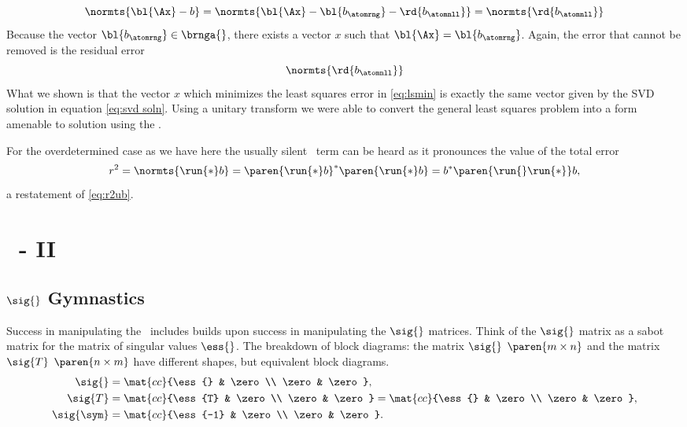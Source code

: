   \begin{equation*}   %
    \normts{ \bl{\Ax} - b } = \normts{ \bl{\Ax} - \bl{b_{\atomrng}} - \rd{b_{\atomnll}} } = \normts{ \rd{b_{\atomnll}} }
  \end{equation*}
Because the vector $\bl{b_{\atomrng}} \in \brnga{}$, there exists a vector $x$ such that $\bl{\Ax} = \bl{b_{\atomrng}}$. Again, the error that cannot be removed is the residual error
  \begin{equation*}   %
    \normts{ \rd{b_{\atomnll}} }
  \end{equation*}
What we shown is that the vector $x$ which minimizes the least squares error in \eqref{eq:lsmin} is exactly the same vector given by the SVD solution in equation \eqref{eq:svd soln}. Using a unitary transform we were able to convert the general least squares problem into a form amenable to solution using the \asvd.

For the overdetermined case as we have here the usually silent \ns \ term can be heard as it pronounces the value of the total error
\begin{equation}
  r^{2} = \normts{ \run{*} b  } = \paren{ \run{*} b  }^{*} \paren{ \run{*} b  } = b^{*} \paren{ \run{}\run{*} } b ,
  \label{eq:r2:a}
\end{equation}
a restatement of \eqref{eq:r2ub}.

\section{\bsvd\ - II}  %

\subsection{$\sig{}$ Gymnastics}  %
Success in manipulating the \asvd \ includes builds	upon success in manipulating the $\sig{}$ matrices. Think of the $\sig{}$ matrix as a sabot matrix for the matrix of singular values $\ess{}$. 
The breakdown of block diagrams: the matrix $\sig{}$ $\paren{m \times n}$ and the matrix $\sig{T}$ $\paren{n \times m}$ have different shapes, but equivalent block diagrams.
  \begin{equation*}   %
    \begin{split}
      \sig{}  &= \mat{cc}{\ess{} & \zero \\ \zero & \zero }, \\
      \sig{T} &= \mat{cc}{\ess{T} & \zero \\ \zero & \zero } = \mat{cc}{\ess{} & \zero \\ \zero & \zero }, \\
      \sig{\sym} &= \mat{cc}{\ess{-1} & \zero \\ \zero & \zero }.
    \end{split}
  \end{equation*}

